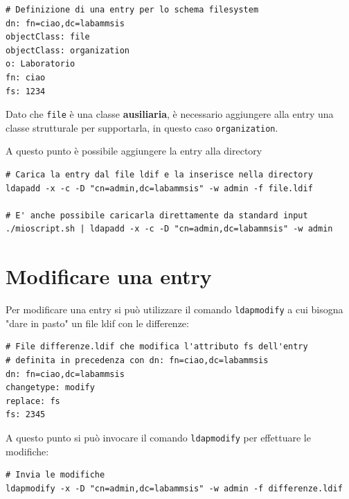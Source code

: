 \documentclass[a4paper]{report}
\newenvironment{info}{\begin{tcolorbox}[fonttitle=\sffamily\bfseries\large,title=Info,colframe=blue!75!white]}{\end{tcolorbox}}
\newenvironment{code}{\begin{tcolorbox}[size=small]}{\end{tcolorbox}}
\begin{document}
\begin{code}
\begin{lstlisting}
# Definizione di una entry per lo schema filesystem
dn: fn=ciao,dc=labammsis
objectClass: file
objectClass: organization
o: Laboratorio
fn: ciao
fs: 1234
\end{lstlisting}
\end{code}

\begin{info}
Dato che \texttt{file} è una classe \textbf{ausiliaria}, è necessario aggiungere alla entry una classe strutturale per supportarla, in questo caso \texttt{organization}.
\end{info}

A questo punto è possibile aggiungere la entry alla directory

\begin{code}
\begin{lstlisting}
# Carica la entry dal file ldif e la inserisce nella directory
ldapadd -x -c -D "cn=admin,dc=labammsis" -w admin -f file.ldif

# E' anche possibile caricarla direttamente da standard input
./mioscript.sh | ldapadd -x -c -D "cn=admin,dc=labammsis" -w admin
\end{lstlisting}
\end{code}

\section{Modificare una entry}

Per modificare una entry si può utilizzare il comando \texttt{ldapmodify} a cui bisogna "dare in pasto" un file ldif con le differenze:

\begin{code}
\begin{lstlisting}
# File differenze.ldif che modifica l'attributo fs dell'entry
# definita in precedenza con dn: fn=ciao,dc=labammsis
dn: fn=ciao,dc=labammsis
changetype: modify
replace: fs
fs: 2345
\end{lstlisting}
\end{code}

A questo punto si può invocare il comando \texttt{ldapmodify} per effettuare le modifiche:
\begin{code}
\begin{lstlisting}
# Invia le modifiche
ldapmodify -x -D "cn=admin,dc=labammsis" -w admin -f differenze.ldif
\end{lstlisting}
\end{code}
\end{document}
